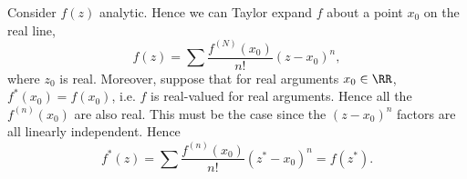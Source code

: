 Consider $f(z)$ analytic. Hence we can Taylor expand $f$ about a point $x_0$ on the real line,
\begin{equation}
    f(z) = \sum \frac{f^{(N)}(x_0)}{n!}(z-x_0)^n,
\end{equation}
where $z_0$ is real. Moreover, suppose that for real arguments $x_0\in \RR$, $f^*(x_0)=f(x_0)$, i.e. $f$ is real-valued for real arguments. Hence all the $f^{(n)}(x_0)$ are also real. This must be the case since the $(z-x_0)^n$ factors are all linearly independent. Hence
\begin{equation}
    f^*(z) = \sum \frac{f^{(n)}(x_0)}{n!}(z^*-x_0)^n = f(z^*).
\end{equation}


